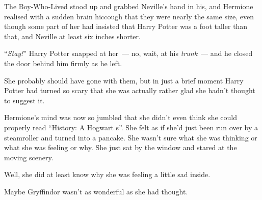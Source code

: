 The Boy-Who-Lived stood up and grabbed Neville's hand in his, and Hermione realised with a sudden brain hiccough that they were nearly the same size, even though some part of her had insisted that Harry Potter was a foot taller than that, and Neville at least six inches shorter.

``\emph{Stay!}'' Harry Potter snapped at her~--- no, wait, at his \emph{trunk}~--- and he closed the door behind him firmly as he left.

She probably should have gone with them, but in just a brief moment Harry Potter had turned so scary that she was actually rather glad she hadn't thought to suggest it.

Hermione's mind was now so jumbled that she didn't even think she could properly read ``History: A Hogwart s''. She felt as if she'd just been run over by a steamroller and turned into a pancake. She wasn't sure what she was thinking or what she was feeling or why. She just sat by the window and stared at the moving scenery.

Well, she did at least know why she was feeling a little sad inside.

Maybe Gryffindor wasn't as wonderful as she had thought.
